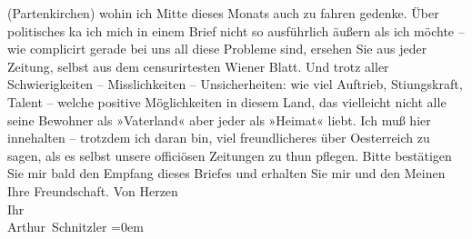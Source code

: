 \begin{ledgroupsized}[t]{13cm}
                  (Partenkirchen) wohin ich Mitte dieses Monats
               auch zu fahren gedenke. Über politisches ka{\geminationn} ich mich in
               einem Brief nicht so ausführlich äußern als ich möchte – wie complicirt gerade bei
               uns all diese Probleme sind, ersehen Sie aus jeder Zeitung, selbst aus dem
               censurirtesten Wiener Blatt. Und trotz aller
               Schwierigkeiten – Misslichkeiten – Unsicherheiten: wie viel Auftrieb, Sti{\geminationm}ungskraft, Talent – welche positive Möglichkeiten in
               diesem Land, das vielleicht
               nicht {\pb}alle seine Bewohner als »Vaterland« aber
               jeder als »Heimat« liebt. Ich muß hier innehalten – trotzdem ich daran bin, viel
               freundlicheres über Oesterreich zu sagen, als
               es \introOben{}selbst\introOben{} unsere officiösen Zeitungen zu thun pflegen.\pend
           \pstart
           Bitte bestätigen Sie mir bald den Empfang dieses Briefes und erhalten Sie mir und den
               Meinen Ihre Freundschaft.\pend
           \pstart
           Von Herzen{\\[\baselineskip]}Ihr{\\[\baselineskip]}\spacefill\mbox{Arthur Schnitzler}\pend
           \leftskip=0em{}
         
         \endnumbering{}\end{ledgroupsized}  \newcommand{\dateiname}{L02292}\newcommand{\titel}{Arthur Schnitzler an Georg Brandes, 2. 8. 1918}\newcommand{\editorInnen}{Martin Anton Müller und Gerd-Hermann Susen}
      